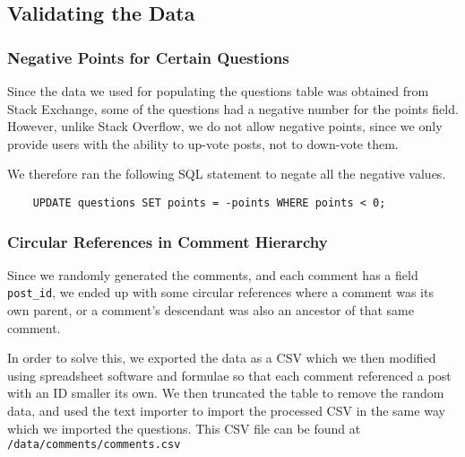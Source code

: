 \subsection{Validating the Data}

\subsubsection{Negative Points for Certain Questions}

Since the data we used for populating the questions table was obtained from Stack Exchange, some of the questions had a negative number for the points field. However, unlike Stack Overflow, we do not allow negative points, since we only provide users with the ability to up-vote posts, not to down-vote them.

We therefore ran the following SQL statement to negate all the negative values.

\begin{verbatim}
	UPDATE questions SET points = -points WHERE points < 0;
\end{verbatim}

\subsubsection{Circular References in Comment Hierarchy}

Since we randomly generated the comments, and each comment has a field \verb`post_id`, we ended up with some circular references where a comment was its own parent, or a comment's descendant was also an ancestor of that same comment.

In order to solve this, we exported the data as a CSV which we then modified using spreadsheet software and formulae so that each comment referenced a post with an ID smaller its own. We then truncated the table to remove the random data, and used the text importer to import the processed CSV in the same way which we imported the questions. This CSV file can be found at \verb`/data/comments/comments.csv`